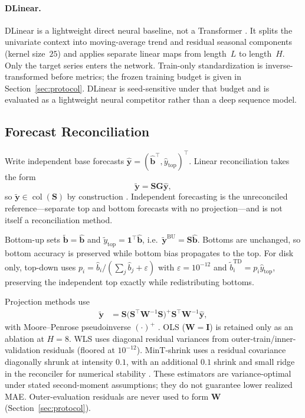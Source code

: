 \documentclass[a4paper,fleqn]{cas-dc}
\begin{document}
\paragraph{DLinear.}
DLinear is a lightweight direct neural baseline, not a Transformer
\cite{zeng2023dlinear}.
It splits the univariate context into moving-average trend and residual seasonal
components (kernel size~$25$) and applies separate linear maps from length~$L$
to length~$H$.
Only the target series enters the network.
Train-only standardization is inverse-transformed before metrics; the frozen
training budget is given in Section~\ref{sec:protocol}.
DLinear is seed-sensitive under that budget and is evaluated as a lightweight
neural competitor rather than a deep sequence model.
\subsection{Forecast Reconciliation}
\label{sec:reconciliation}
Write independent base forecasts
$\hat{\mathbf{y}}=(\hat{\mathbf{b}}^\top,\hat{y}_{\mathrm{top}})^\top$.
Linear reconciliation takes the form
\begin{equation}
\tilde{\mathbf{y}}=\mathbf{S}\mathbf{G}\hat{\mathbf{y}},
\label{eq:recon}
\end{equation}
so $\tilde{\mathbf{y}}\in\operatorname{col}(\mathbf{S})$ by construction
\cite{hyndman2011optimal,athanasopoulos2024hierarchical}.
Independent forecasting is the unreconciled reference---separate top and bottom
forecasts with no projection---and is not itself a reconciliation method.

Bottom-up sets $\tilde{\mathbf{b}}=\hat{\mathbf{b}}$ and
$\tilde{y}_{\mathrm{top}}=\mathbf{1}^\top\hat{\mathbf{b}}$, i.e.\
$\tilde{\mathbf{y}}^{\mathrm{BU}}=\mathbf{S}\hat{\mathbf{b}}$.
Bottoms are unchanged, so bottom accuracy is preserved while bottom bias
propagates to the top.
For disk only, top-down uses
$p_i=\hat{b}_i/(\sum_j\hat{b}_j+\varepsilon)$ with $\varepsilon=10^{-12}$ and
$\tilde{b}_i^{\mathrm{TD}}=p_i\hat{y}_{\mathrm{top}}$, preserving the independent
top exactly while redistributing bottoms.

Projection methods use
\begin{equation}
\begin{aligned}
\tilde{\mathbf{y}}
&=
\mathbf{S}
\bigl(\mathbf{S}^{\top}\mathbf{W}^{-1}\mathbf{S}\bigr)^{+}
\mathbf{S}^{\top}\mathbf{W}^{-1}
\hat{\mathbf{y}},
\end{aligned}
\label{eq:projection}
\end{equation}
with Moore--Penrose pseudoinverse $(\cdot)^{+}$
\cite{wickramasuriya2019mint}.
{OLS} ($\mathbf{W}=\mathbf{I}$) is retained only as an ablation at $H=8$.
{WLS} uses diagonal residual variances from outer-train/inner-validation
residuals (floored at $10^{-12}$).
MinT-shrink uses a residual covariance diagonally shrunk at intensity $0.1$,
with an additional $0.1$ shrink and small ridge in the reconciler for numerical
stability \cite{schafer2005shrinkage,wickramasuriya2019mint}.
These estimators are variance-optimal under stated second-moment assumptions;
they do not guarantee lower realized {MAE}.
Outer-evaluation residuals are never used to form $\mathbf{W}$
(Section~\ref{sec:protocol}).
\end{document}
